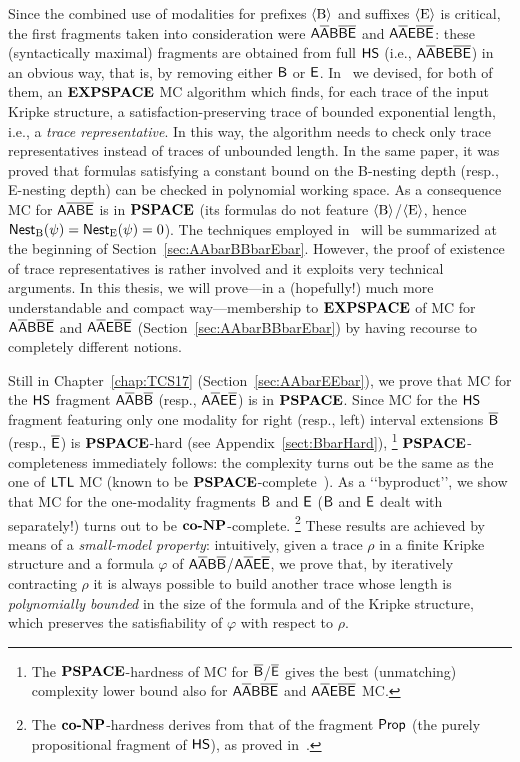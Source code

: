 Since the combined use of modalities for prefixes $\operatorname{\langle B\rangle}$ and suffixes $\operatorname{\langle E\rangle}$ is critical,
the first fragments taken into consideration were 
$\mathsf{A\overline{A}B\overline{B}\overline{E}}$ and $\mathsf{A\overline{A}E\overline{B}\overline{E}}$:
these (syntactically maximal) fragments are obtained from full $\text{\sffamily HS}$ (i.e., $\mathsf{A\overline{A}}\mathsf{BE}\mathsf{\overline{B}}\mathsf{\overline{E}}$) in an obvious way, that is, by removing either $\mathsf{B}$ or $\mathsf{E}$.
In~\cite{MMP15} we devised, for both of them, an $\textbf{EXPSPACE}$ MC algorithm which finds, for each trace of the input Kripke structure, a satisfaction-preserving trace of bounded exponential length, i.e., a \emph{trace representative}. In this way, the algorithm needs to check only trace representatives instead of traces of unbounded length. In the same paper, it was proved that formulas satisfying a constant bound on the B-nesting depth (resp., E-nesting depth) can be checked in polynomial working space. As a consequence MC for $\mathsf{A\overline{A}}\mathsf{\overline{B}}\mathsf{\overline{E}}$ is in $\textbf{PSPACE}$ (its formulas do not feature $\operatorname{\langle B\rangle}$/$\operatorname{\langle E\rangle}$, hence $\operatorname{\mathsf{Nest}_B}(\psi)=\operatorname{\mathsf{Nest}_E}(\psi)=0$).
The techniques employed in~\cite{MMP15} will be summarized at the beginning of Section~\ref{sec:AAbarBBbarEbar}.
However, the proof of existence of trace representatives is rather involved and it exploits very technical arguments. In this thesis, we will prove---in a (hopefully!) much more understandable and compact way---membership to $\textbf{EXPSPACE}$ of MC for $\mathsf{A\overline{A}B\overline{B}\overline{E}}$ and $\mathsf{A\overline{A}E\overline{B}\overline{E}}$ (Section~\ref{sec:AAbarBBbarEbar}) by having recourse to completely different notions.

Still in Chapter~\ref{chap:TCS17} (Section~\ref{sec:AAbarEEbar}), we prove that MC for the $\text{\sffamily HS}$ fragment $\mathsf{A\overline{A}B\overline{B}}$ (resp., $\mathsf{A\overline{A}E\overline{E}}$) %
is in $\textbf{PSPACE}$.
Since MC for the $\text{\sffamily HS}$ fragment featuring only one modality for right (resp., left) interval extensions $\mathsf{\overline{B}}$ (resp., $\mathsf{\overline{E}}$) is $\textbf{PSPACE}$-hard (see Appendix~\ref{sect:BbarHard}),%
\footnote{The $\textbf{PSPACE}$-hardness of MC for $\mathsf{\overline{B}}$/$\mathsf{\overline{E}}$ gives the best (unmatching) complexity lower bound also for $\mathsf{A\overline{A}B\overline{B}\overline{E}}$ and $\mathsf{A\overline{A}E\overline{B}\overline{E}}$ MC.}
$\textbf{PSPACE}$-completeness immediately follows: 
the complexity turns out be the same as the one of $\text{\sffamily LTL}$ MC (known to be $\textbf{PSPACE}$-complete~\cite{Sistla:1985}).
As a \lq\lq byproduct\rq\rq , we show that MC for the one-modality fragments $\mathsf{B}$ and $\mathsf{E}$ ($\mathsf{B}$ and $\mathsf{E}$ dealt with separately!) turns out to be $\textbf{co-}\textbf{NP}$-complete.%
\footnote{The $\textbf{co-}\textbf{NP}$-hardness derives from that of the fragment $\mathsf{Prop}$ (the purely propositional fragment of $\text{\sffamily HS}$), as proved in~\cite{MMP15B}.}
These results are achieved by means of a \emph{small-model property}: intuitively, given a trace $\rho$ in a finite Kripke structure and a formula $\varphi$ of $\mathsf{A\overline{A}B\overline{B}}$/$\mathsf{A\overline{A}E\overline{E}}$, we prove that, by iteratively contracting $\rho$ it is always possible to build another trace
whose length is \emph{polynomially bounded} in the size of the formula and of the Kripke structure, which preserves the satisfiability of  $\varphi$  with respect to  $\rho$. 

